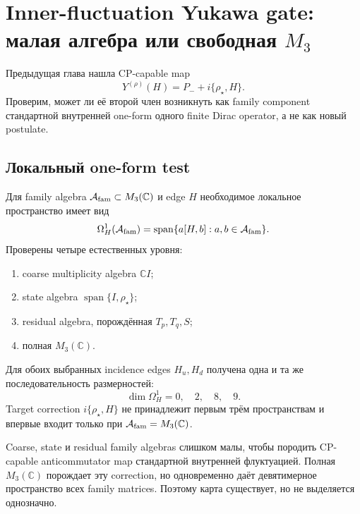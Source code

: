 \chapter{Inner-fluctuation Yukawa gate: малая алгебра или свободная
\texorpdfstring{\(M_3\)}{M3}}

Предыдущая глава нашла CP-capable map
\begin{equation}
 Y^{(\rho)}(H)=P_-+i\{\rho_\star,H\}.
\end{equation}
Проверим, может ли её второй член возникнуть как family component стандартной
внутренней one-form одного finite Dirac operator, а не как новый postulate.

\section{Локальный one-form test}

Для family algebra \(\mathcal A_{\rm fam}\subset M_3(\mathbb C)\) и edge
\(H\) необходимое локальное пространство имеет вид
\begin{equation}
 \Omega_H^1(\mathcal A_{\rm fam})=
 \operatorname{span}\{a[H,b]:a,b\in\mathcal A_{\rm fam}\}.
\end{equation}
Проверены четыре естественных уровня:
\begin{enumerate}
\item coarse multiplicity algebra \(\mathbb C I\);
\item state algebra \(\operatorname{span}\{I,\rho_\star\}\);
\item residual algebra, порождённая \(T_p,T_q,S\);
\item полная \(M_3(\mathbb C)\).
\end{enumerate}

Для обоих выбранных incidence edges \(H_u,H_d\) получена одна и та же
последовательность размерностей:
\begin{equation}
 \dim\Omega_H^1=0,\quad2,\quad8,\quad9.
\end{equation}
Target correction \(i\{\rho_\star,H\}\) не принадлежит первым трём
пространствам и впервые входит только при
\(\mathcal A_{\rm fam}=M_3(\mathbb C)\).

\begin{theorem}
Coarse, state и residual family algebras слишком малы, чтобы породить
CP-capable anticommutator map стандартной внутренней флуктуацией. Полная
\(M_3(\mathbb C)\) порождает эту correction, но одновременно даёт
девятимерное пространство всех family matrices. Поэтому карта существует,
но не выделяется однозначно.
\end{theorem}

